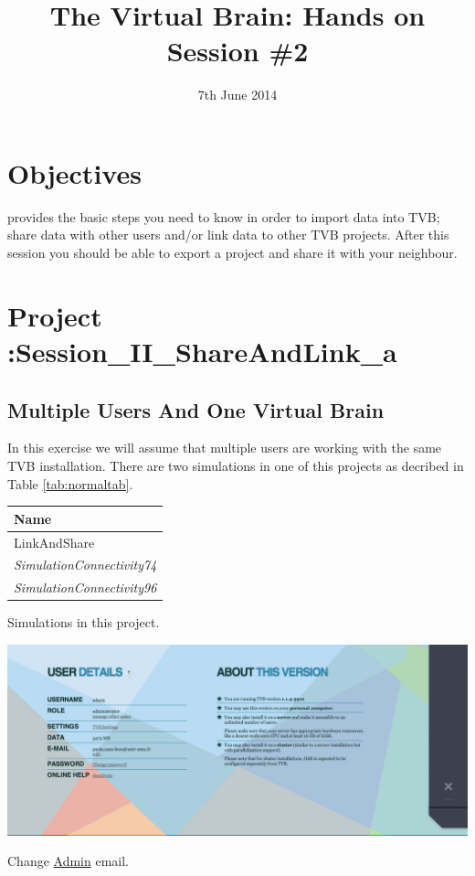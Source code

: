 \documentclass{tufte-handout}
\title{The Virtual Brain: Hands on Session \#2}
\date{7th June 2014}
\begin{document}

\newpage
\ClearWallPaper

\section{Objectives}\label{sec:objectives}

 provides the basic steps you need to know in order to import data into TVB; share data with other users and/or link data to other TVB projects.
After this session you should be able to export a project and share it with your neighbour. 

\section{Project :Session\_II\_ShareAndLink\_a}\label{sec:project_data}

\subsection{Multiple Users And One Virtual Brain}\label{sec:multiusers}
In this exercise we will assume that multiple users are working with the same TVB installation.  There are two simulations in one of this projects as decribed in Table \ref{tab:normaltab}.

\begin{margintable}
  \centering
  \selectfont
  \begin{tabular}{l}
    \toprule
    Name \\
    \midrule
    \multicolumn{1}{l}{LinkAndShare}\\
    \textit{SimulationConnectivity74} \\
    \textit{SimulationConnectivity96} \\
    \bottomrule
  \end{tabular}
  \caption{Simulations in this project.}
  \label{tab:normaltab}
\end{margintable}


\begin{marginfigure}
  \includegraphics[width=\linewidth]{Handout_UI_LinkAndShare_ChangeAdminEmail}%
  \caption{Change \underline{Admin} email.}%
  \label{fig:change_email}%
\end{marginfigure}
\end{document}

